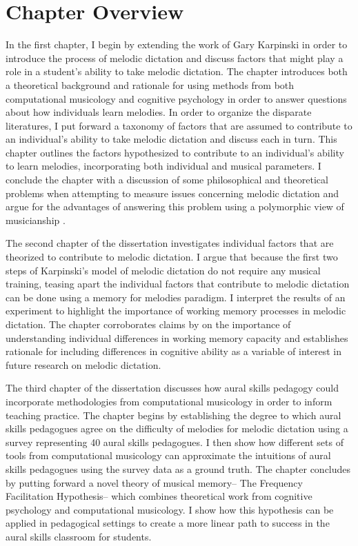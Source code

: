 \documentclass[12pt,]{book}
\begin{document}
\hypertarget{chapter-overview}{%
\section{Chapter Overview}\label{chapter-overview}}

In the first chapter, I begin by extending the work of Gary Karpinski \citep{karpinskiAuralSkillsAcquisition2000, karpinskiModelMusicPerception1990} in order to introduce the process of melodic dictation and discuss factors that might play a role in a student's ability to take melodic dictation.
The chapter introduces both a theoretical background and rationale for using methods from both computational musicology and cognitive psychology in order to answer questions about how individuals learn melodies.
In order to organize the disparate literatures, I put forward a taxonomy of factors that are assumed to contribute to an individual's ability to take melodic dictation and discuss each in turn.
This chapter outlines the factors hypothesized to contribute to an individual's ability to learn melodies, incorporating both individual and musical parameters.
I conclude the chapter with a discussion of some philosophical and theoretical problems when attempting to measure issues concerning melodic dictation and argue for the advantages of answering this problem using a polymorphic view of musicianship \citep{levitinWhatDoesIt2012, peretzNatureMusicBiological2006, bakerExaminingMusicalSophistication2018a}.

The second chapter of the dissertation investigates individual factors that are theorized to contribute to melodic dictation.
I argue that because the first two steps of Karpinski's model of melodic dictation do not require any musical training, teasing apart the individual factors that contribute to melodic dictation can be done using a memory for melodies paradigm.
I interpret the results of an experiment to highlight the importance of working memory processes in melodic dictation.
The chapter corroborates claims by \citet{berzWorkingMemoryMusic1995} on the importance of understanding individual differences in working memory capacity and establishes rationale for including differences in cognitive ability as a variable of interest in future research on melodic dictation.

The third chapter of the dissertation discusses how aural skills pedagogy could incorporate methodologies from computational musicology in order to inform teaching practice.
The chapter begins by establishing the degree to which aural skills pedagogues agree on the difficulty of melodies for melodic dictation using a survey representing 40 aural skills pedagogues.
I then show how different sets of tools from computational musicology can approximate the intuitions of aural skills pedagogues using the survey data as a ground truth.
The chapter concludes by putting forward a novel theory of musical memory-- The Frequency Facilitation Hypothesis-- which combines theoretical work from cognitive psychology and computational musicology.
I show how this hypothesis can be applied in pedagogical settings to create a more linear path to success in the aural skills classroom for students.
\end{document}
